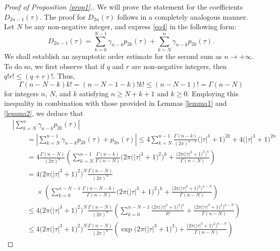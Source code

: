 \documentclass[pdftex]{sigma}
\numberwithin{equation}{section}
\begin{document}
\begin{proof}[Proof of Proposition \ref{prop1}.] We will prove the statement for the coefficients $D_{2n - 1} (\tau )$. The proof for $D_{2n} (\tau)$ follows in a completely analogous manner. Let $N$ be any non-negative integer, and express \eqref{eq4} in the following form:
\begin{equation}\label{eq20}
D_{2n - 1} (\tau ) = \sum_{k = 0}^{N - 1}\gamma _{n - k} p_{2k} (\tau ) + \sum_{k = N}^n \gamma _{n - k} p_{2k} (\tau ).
\end{equation}
We shall establish an asymptotic order estimate for the second sum as $n\to+\infty$. To do so, we first observe that if $q$ and $r$ are non-negative integers, then $q!r! \le (q + r)!$. Thus,
\[
\Gamma (n - N - k)k! = (n - N - 1 - k)!k! \le (n - N - 1)! = \Gamma (n - N)
\]
for integers $n$, $N$, and $k$ satisfying $n \ge N+k+1$ and $k\ge 0$. Employing this inequality in combination with those provided in Lemmas \ref{lemma1} and \ref{lemma2}, we deduce that
\begin{align*}
& \left| \sum_{k = N}^n \gamma _{n - k} p_{2k} (\tau ) \right| \\
&\qquad= \left| \sum_{k = N}^{n-1} \gamma _{n - k} p_{2k} (\tau ) + p_{2n} (\tau )\right| \le 4\sum_{k = N}^{n - 1} \frac{\Gamma (n - k)}{(2\pi )^{n - k} }\bigl(\left| \tau \right|^3 + 1\bigr)^{2k} + 4\bigl(\left| \tau \right|^3 + 1\bigr)^{2n}
\\ & \qquad= 4\frac{\Gamma (n - N)}{(2\pi )^n }\left( \sum_{k = N}^{n - 1} \frac{\Gamma (n - k)}{\Gamma(n - N)}\big(2\pi \bigl(\left| \tau \right|^3 + 1\bigr)^2 \big)^k + \frac{\big(2\pi \bigl(\left| \tau \right|^3 + 1\bigr)^2 \big)^n }{\Gamma (n - N)} \right)
\\ & \qquad= 4\big(2\pi \bigl(\left| \tau \right|^3 + 1\bigr)^2 \big)^N \frac{\Gamma(n - N)}{(2\pi )^n }\\
&\phantom{\qquad=}{}\times\left( \sum_{k = 0}^{n - N - 1} \frac{\Gamma (n - N - k)}{\Gamma (n - N)}\big(2\pi \bigl(\left| \tau \right|^3 + 1\bigr)^2 \big)^k + \frac{\big(2\pi \bigl(\left| \tau \right|^3 + 1\bigr)^2 \big)^{n - N} }{\Gamma(n - N)} \right)
\\ & \qquad\le 4\big(2\pi \bigl(\left| \tau \right|^3 + 1\bigr)^2 \big)^N \frac{\Gamma(n - N)}{(2\pi )^n }\left( \sum_{k = 0}^{n - N - 1} \frac{\big(2\pi \bigl(\left| \tau \right|^3 + 1\bigr)^2 \big)^k }{k!} + \frac{\big(2\pi \bigl(\left| \tau \right|^3 + 1\bigr)^2 \big)^{n - N} }{\Gamma(n - N)}\right)
\\ & \qquad\le 4\big(2\pi \bigl(\left| \tau \right|^3 + 1\bigr)^2 \big)^N \frac{\Gamma(n - N)}{(2\pi )^n }\left( \exp \big( 2\pi \bigl(\left| \tau \right|^3 + 1\bigr)^2 \big) + \frac{\big(2\pi \bigl(\left| \tau \right|^3 + 1\bigr)^2 \big)^{n - N} }{\Gamma(n - N)} \right)

\end{align*}
\end{proof}
\end{document}
